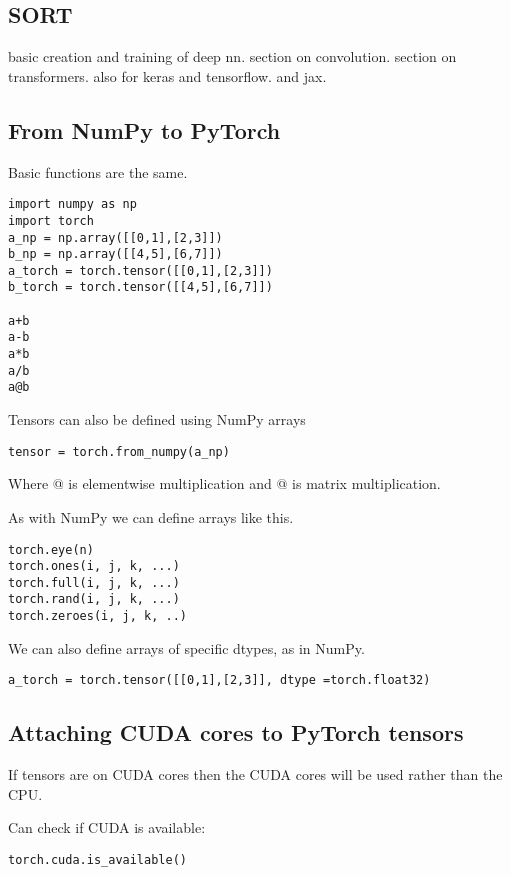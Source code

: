 

\subsection{SORT}

basic creation and training of deep nn.
section on convolution. section on transformers. also for keras and tensorflow. and jax.

\subsection{From NumPy to PyTorch}

Basic functions are the same.

\begin{verbatim}
import numpy as np
import torch
a_np = np.array([[0,1],[2,3]])
b_np = np.array([[4,5],[6,7]])
a_torch = torch.tensor([[0,1],[2,3]])
b_torch = torch.tensor([[4,5],[6,7]])

a+b
a-b
a*b
a/b
a@b
\end{verbatim}

Tensors can also be defined using NumPy arrays

\begin{verbatim}
tensor = torch.from_numpy(a_np)
\end{verbatim}


Where @ is elementwise multiplication and @ is matrix multiplication.

As with NumPy we can define arrays like this.
\begin{verbatim}
torch.eye(n)
torch.ones(i, j, k, ...)
torch.full(i, j, k, ...)
torch.rand(i, j, k, ...)
torch.zeroes(i, j, k, ..)
\end{verbatim}

We can also define arrays of specific dtypes, as in NumPy.

\begin{verbatim}
a_torch = torch.tensor([[0,1],[2,3]], dtype =torch.float32)
\end{verbatim}

\subsection{Attaching CUDA cores to PyTorch tensors}

If tensors are on CUDA cores then the CUDA cores will be used rather than the CPU.

Can check if CUDA is available:
\begin{verbatim}
torch.cuda.is_available()
\end{verbatim}

